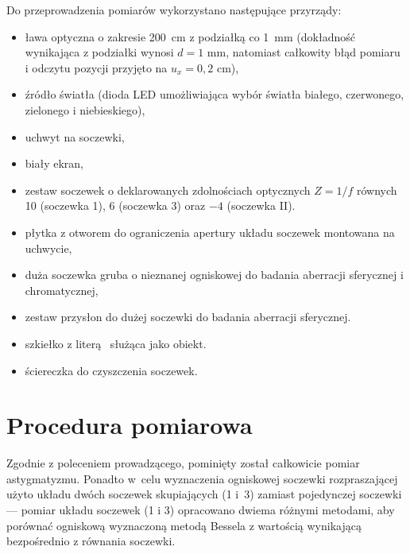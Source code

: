 \documentclass[12pt, a4paper]{article}
\begin{document}
Do przeprowadzenia pomiarów wykorzystano następujące przyrządy:
\begin{itemize}
    \item ława optyczna o zakresie 200~cm z podziałką co 1~mm (dokładność wynikająca z podziałki wynosi $d=1\text{ mm}$, natomiast całkowity błąd pomiaru i odczytu pozycji przyjęto na $u_x = 0{,}2\text{ cm}$),
    \item źródło światła (dioda LED umożliwiająca wybór światła białego, czerwonego, zielonego i niebieskiego),
    \item uchwyt na soczewki,
    \item biały ekran,
    \item zestaw soczewek o deklarowanych zdolnościach optycznych $Z = 1/f$ równych 10 (soczewka 1), 6 (soczewka 3) oraz $-4$ (soczewka II).
    \item płytka z otworem do ograniczenia apertury układu soczewek montowana na uchwycie,
    \item duża soczewka gruba o nieznanej ogniskowej do badania aberracji sferycznej i chromatycznej,
    \item zestaw przysłon do dużej soczewki do badania aberracji sferycznej.
    \item szkiełko z literą~ służąca jako obiekt.
    \item ściereczka do czyszczenia soczewek.
\end{itemize}

\section{Procedura pomiarowa}

Zgodnie z poleceniem prowadzącego, pominięty został całkowicie pomiar astygmatyzmu. Ponadto w~celu wyznaczenia ogniskowej soczewki rozpraszającej użyto układu dwóch soczewek skupiających (1 i~3) zamiast pojedynczej soczewki --- pomiar układu soczewek (1 i 3) opracowano dwiema różnymi metodami, aby porównać ogniskową wyznaczoną metodą Bessela z wartością wynikającą bezpośrednio z równania soczewki.
\end{document}
